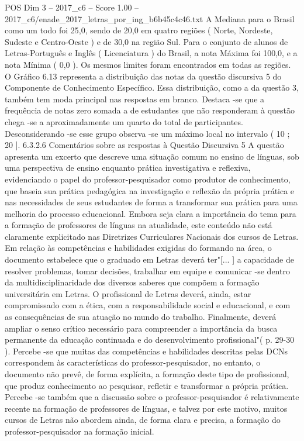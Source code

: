 \begin{textsample}{POS Dim 3 – 2017\_c6 – Score 1.00 – 2017\_c6/enade\_2017\_letras\_por\_ing\_b6b45c4c46.txt}
A Mediana para o Brasil como um todo foi 25,0, sendo de 20,0 em quatro regiões ( Norte, Nordeste, Sudeste e Centro-Oeste ) e de 30,0 na região Sul.
Para o conjunto de alunos de Letras-Português e Inglês ( Licenciatura ) do Brasil, a nota Máxima foi 100,0, e a nota Mínima ( 0,0 ).
Os mesmos limites foram encontrados em todas as regiões.
O Gráfico 6.13 representa a distribuição das notas da questão discursiva 5 do Componente de Conhecimento Específico.
Essa distribuição, como a da questão 3, também tem moda principal nas respostas em branco.
Destaca -se que a frequência de notas zero somada a de estudantes que não responderam à questão chega -se a aproximadamente um quarto do total de participantes.
Desconsiderando -se esse grupo observa -se um máximo local no intervalo ( 10 ; 20 ]. 6.3.2.6 Comentários sobre as respostas à Questão Discursiva 5 A questão apresenta um excerto que descreve uma situação comum no ensino de línguas, sob uma perspectiva de ensino enquanto prática investigativa e reflexiva, evidenciando o papel do professor-pesquisador como produtor de conhecimento, que baseia sua prática pedagógica na investigação e reflexão da própria prática e nas necessidades de seus estudantes de forma a transformar sua prática para uma melhoria do processo educacional.
Embora seja clara a importância do tema para a formação de professores de línguas na atualidade, este conteúdo não está claramente explicitado nas Diretrizes Curriculares Nacionais dos cursos de Letras.
Em relação às competências e habilidades exigidas do formando na área, o documento estabelece que o graduado em Letras deverá ter"[... ] a capacidade de resolver problemas, tomar decisões, trabalhar em equipe e comunicar -se dentro da multidisciplinaridade dos diversos saberes que compõem a formação universitária em Letras.
O profissional de Letras deverá, ainda, estar compromissado com a ética, com a responsabilidade social e educacional, e com as consequências de sua atuação no mundo do trabalho.
Finalmente, deverá ampliar o senso crítico necessário para compreender a importância da busca permanente da educação continuada e do desenvolvimento profissional"( p. 29-30 ).
Percebe -se que muitas das competências e habilidades descritas pelas DCNs correspondem às características do professor-pesquisador, no entanto, o documento não prevê, de forma explícita, a formação deste tipo de profissional, que produz conhecimento ao pesquisar, refletir e transformar a própria prática.
Percebe -se também que a discussão sobre o professor-pesquisador é relativamente recente na formação de professores de línguas, e talvez por este motivo, muitos cursos de Letras não abordem ainda, de forma clara e precisa, a formação do professor-pesquisador na formação inicial.

\end{textsample}
